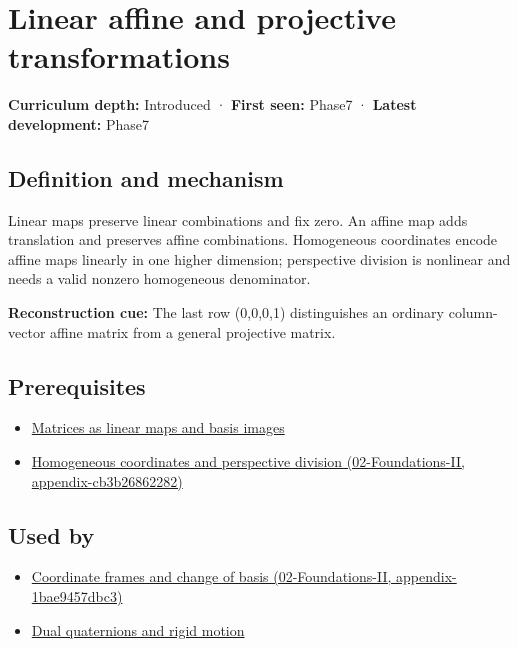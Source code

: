 \hypertarget{appendix-0bf0ca73f735}{}
\section{Linear affine and projective transformations}\label{appendix-0bf0ca73f735-linear-affine-and-projective-transformations}

\textbf{Curriculum depth:} Introduced · \textbf{First seen:} Phase7 · \textbf{Latest development:} Phase7

\subsection{Definition and mechanism}\label{appendix-0bf0ca73f735-definition-and-mechanism}

Linear maps preserve linear combinations and fix zero. An affine map adds translation and preserves affine combinations. Homogeneous coordinates encode affine maps linearly in one higher dimension; perspective division is nonlinear and needs a valid nonzero homogeneous denominator.

\textbf{Reconstruction cue:} The last row (0,0,0,1) distinguishes an ordinary column-vector affine matrix from a general projective matrix.

\subsection{Prerequisites}\label{appendix-0bf0ca73f735-prerequisites}

\begin{itemize}
\tightlist
\item
  \hyperref[appendix-bd39c3bf5d64]{Matrices as linear maps and basis images}
\item
  \href{../02-Foundations-II/main.pdf\#nameddest=appendix-cb3b26862282}{Homogeneous coordinates and perspective division (02-Foundations-II, appendix-cb3b26862282)}
\end{itemize}

\subsection{Used by}\label{appendix-0bf0ca73f735-used-by}

\begin{itemize}
\tightlist
\item
  \href{../02-Foundations-II/main.pdf\#nameddest=appendix-1bae9457dbc3}{Coordinate frames and change of basis (02-Foundations-II, appendix-1bae9457dbc3)}
\item
  \hyperref[appendix-d1ea57347893]{Dual quaternions and rigid motion}
\end{itemize}

